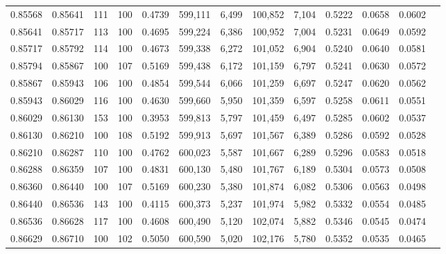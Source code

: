 \begin{tabular}{rrrrrrrrrrrrr}
0.85568 & 0.85641 &   111 & 100 &                                     0.4739 & 599,111 &   6,499 & 100,852 &   7,104 & 0.5222 & 0.0658 & 0.0602 \\
0.85641 & 0.85717 &   113 & 100 &                                     0.4695 & 599,224 &   6,386 & 100,952 &   7,004 & 0.5231 & 0.0649 & 0.0592 \\
0.85717 & 0.85792 &   114 & 100 &                                     0.4673 & 599,338 &   6,272 & 101,052 &   6,904 & 0.5240 & 0.0640 & 0.0581 \\
0.85794 & 0.85867 &   100 & 107 &                                     0.5169 & 599,438 &   6,172 & 101,159 &   6,797 & 0.5241 & 0.0630 & 0.0572 \\
0.85867 & 0.85943 &   106 & 100 &                                     0.4854 & 599,544 &   6,066 & 101,259 &   6,697 & 0.5247 & 0.0620 & 0.0562 \\
0.85943 & 0.86029 &   116 & 100 &                                     0.4630 & 599,660 &   5,950 & 101,359 &   6,597 & 0.5258 & 0.0611 & 0.0551 \\
0.86029 & 0.86130 &   153 & 100 &                                     0.3953 & 599,813 &   5,797 & 101,459 &   6,497 & 0.5285 & 0.0602 & 0.0537 \\
0.86130 & 0.86210 &   100 & 108 &                                     0.5192 & 599,913 &   5,697 & 101,567 &   6,389 & 0.5286 & 0.0592 & 0.0528 \\
0.86210 & 0.86287 &   110 & 100 &                                     0.4762 & 600,023 &   5,587 & 101,667 &   6,289 & 0.5296 & 0.0583 & 0.0518 \\
0.86288 & 0.86359 &   107 & 100 &                                     0.4831 & 600,130 &   5,480 & 101,767 &   6,189 & 0.5304 & 0.0573 & 0.0508 \\
0.86360 & 0.86440 &   100 & 107 &                                     0.5169 & 600,230 &   5,380 & 101,874 &   6,082 & 0.5306 & 0.0563 & 0.0498 \\
0.86440 & 0.86536 &   143 & 100 &                                     0.4115 & 600,373 &   5,237 & 101,974 &   5,982 & 0.5332 & 0.0554 & 0.0485 \\
0.86536 & 0.86628 &   117 & 100 &                                     0.4608 & 600,490 &   5,120 & 102,074 &   5,882 & 0.5346 & 0.0545 & 0.0474 \\
0.86629 & 0.86710 &   100 & 102 &                                     0.5050 & 600,590 &   5,020 & 102,176 &   5,780 & 0.5352 & 0.0535 & 0.0465 \\

\end{tabular}
